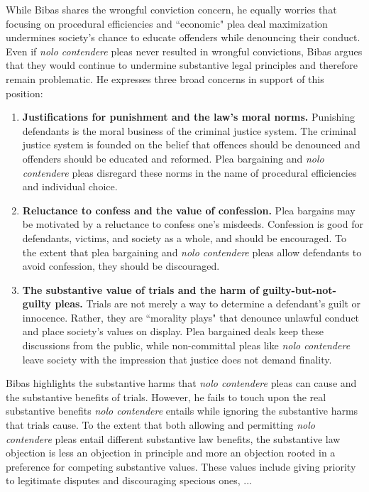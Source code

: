 While Bibas shares the wrongful conviction concern, he equally worries that focusing on procedural efficiencies and ``economic" plea deal maximization undermines society's chance to educate offenders while denouncing their conduct. Even if \textit{nolo contendere} pleas never resulted in wrongful convictions, Bibas argues that they would continue to undermine substantive legal principles and therefore remain problematic. He expresses three broad concerns in support of this position:

\begin{enumerate}
    \item \textbf{Justifications for punishment and the law's moral norms.} Punishing defendants is the moral business of the criminal justice system. The criminal justice system is founded on the belief that offences should be denounced and offenders should be educated and reformed. Plea bargaining and \textit{nolo contendere} pleas disregard these norms in the name of procedural efficiencies and individual choice.
    \item \textbf{Reluctance to confess and the value of confession.} Plea bargains may be motivated by a reluctance to confess one's misdeeds. Confession is good for defendants, victims, and society as a whole, and should be encouraged. To the extent that plea bargaining and \textit{nolo contendere} pleas allow defendants to avoid confession, they should be discouraged.
    \item \textbf{The substantive value of trials and the harm of guilty-but-not-guilty pleas.} Trials are not merely a way to determine a defendant's guilt or innocence. Rather, they are ``morality plays" that denounce unlawful conduct and place society's values on display. Plea bargained deals keep these discussions from the public, while non-committal pleas like \textit{nolo contendere} leave society with the impression that justice does not demand finality.
\end{enumerate}

Bibas highlights the substantive harms that \textit{nolo contendere} pleas can cause and the substantive benefits of trials. However, he fails to touch upon the real substantive benefits \textit{nolo contendere} entails while ignoring the substantive harms that trials cause. To the extent that both allowing and permitting \textit{nolo contendere} pleas entail different substantive law benefits, the substantive law objection is less an objection in principle and more an objection rooted in a preference for competing substantive values. These values include giving priority to legitimate disputes and discouraging specious ones, ... 

